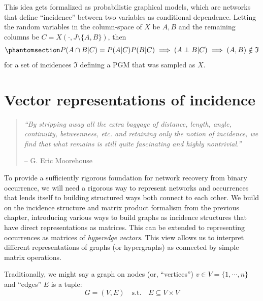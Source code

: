 \documentclass[%
	12pt,
		oneside,
		letterpaper
]{book}
\begin{document}
This idea gets formalized as probabilistic graphical models, which are
networks that define ``incidence'' between two variables as conditional
dependence. Letting the random variables in the column-space of \(X\) be
\(A,B\) and the remaining columns be \(C=X(\cdot,J\setminus \{A,B\})\),
then \begin{equation}\phantomsection\label{eq-cond-indep}{
P(A\cap B |C ) = P(A|C)P(B|C)\implies (A\perp B|C)\implies (A,B)\notin \mathfrak{I}
}\end{equation} for a set of incidences \(\mathfrak{I}\) defining a PGM
that was sampled as \(X\).

\chapter{Vector representations of incidence}\label{sec-vec}

\begin{flushright}

\begin{minipage}{.7\linewidth}

\singlespacing

\begin{quote}
\emph{``By stripping away all the extra baggage of distance, length,
angle, continuity, betweenness, etc. and retaining only the notion of
incidence, we find that what remains is still quite fascinating and
highly nontrivial.''}

\hfill -- G. Eric Moorehouse\\
\doublespacing 
\end{quote}

\end{minipage}

\end{flushright}

To provide a sufficiently rigorous foundation for network recovery from
binary occurrence, we will need a rigorous way to represent networks and
occurrences that lends itself to building structured ways both connect
to each other. We build on the incidence structure and matrix product
formalism from the previous chapter, introducing various ways to build
graphs as incidence structures that have direct representations as
matrices. This can be extended to representing occurrences as matrices
of \emph{hyperedge vectors}. This view allows us to interpret different
representations of graphs (or hypergraphs) as connected by simple matrix
operations.

Traditionally\autocite{MathematicalfoundationsGraphBLAS_Kepner2016,WhyHowWhen_Torres2021},
we might say a graph on nodes (or, ``vertices'')
\(v\in V=\{1,\cdots,n\}\) and ``edges'' \(E\) is a tuple: \[
G=(V,E) \quad \textrm{s.t.} \quad E\subseteq V \times V
\]
\end{document}
